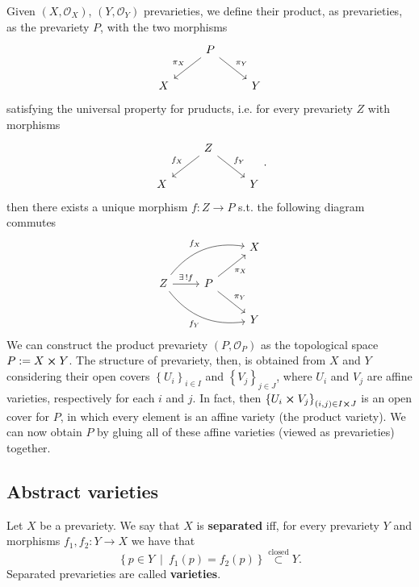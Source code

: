 \begin{defn}
	Given $\left( X, \mathcal{O}_{ X } \right)$, $\left( Y, \mathcal{O}_{ Y } \right)$ prevarieties, we define their product, as prevarieties, as the prevariety $P$, with the two morphisms
	\begin{equation}
	\begin{tikzcd}
		& P \arrow[ld, "\pi_X"', rightarrow] \arrow[rd, "\pi_Y", rightarrow] & \\
		X & & Y
	\end{tikzcd}
	\end{equation} 
	satisfying the universal property for pruducts, i.e.
	for every prevariety $Z$ with morphisms
	\begin{equation}
	\begin{tikzcd}
		& Z \arrow[ld, "f_X"', rightarrow] \arrow[rd, "f_Y", rightarrow] \\
		X & & Y
	\end{tikzcd}
	.\end{equation} 
	then there exists a unique morphism $f: Z \to P$ s.t. the following diagram commutes
	\begin{equation}
	\begin{tikzcd}
		& & X\\
		Z \arrow[r, "\exists\, ! f", rightarrow] \arrow[rru, "f_X", rightarrow, bend left] \arrow[drr, "f_Y"', rightarrow, bend right] & P \arrow[ru, "\pi_X"', rightarrow] \arrow[rd, "\pi_Y", rightarrow] & \\
		& & Y
	\end{tikzcd}	
	\end{equation}
	We can construct the product prevariety $\left( P, \mathcal{O}_{ P } \right)$ as the topological space $P := X \cross Y$.
	The structure of prevariety, then, is obtained from $X$ and $Y$ considering their open covers
	$\left\{ U_i \right\}_{i \in I}$ and $\left\{ V_j \right\}_{j \in J}$,
	where $U_i$ and $V_j$ are affine varieties, respectively for each $i$ and $j$.
	In fact, then $\left\{ U_i \cross V_j \right\}_{\left(i, j\right) \in I \cross J}$ is an open cover for $P$,
	in which every element is an affine variety (the product variety).
	We can now obtain $P$ by gluing all of these affine varieties (viewed as prevarieties) together.
\end{defn}

\subsection{Abstract varieties}
\begin{defn}[Variety]
	Let $X$ be a prevariety.
	We say that $X$ is \textbf{separated} iff, for every prevariety $Y$ and morphisms $f_1, f_2: Y \to X$ we have that
	\begin{equation}
	\left\{ p \in Y \ \middle|\ f_1(p) = f_2(p) \right\} \stackrel{\text{closed}}{\subset} Y
	.\end{equation}
	Separated prevarieties are called \textbf{varieties}.
\end{defn}

